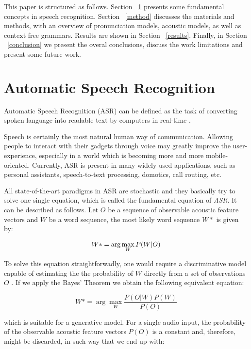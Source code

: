 \documentclass[twocolumn]{bmcart}%
\begin{document}
This paper is structured as follows. Section ~\ref{sec:speech-recognition} presents some fundamental concepts in speech recognition. Section ~\ref{method} discusses the materials and methods, with an overview of pronunciation models, acoustic models, as well as context free grammars. Results are shown in Section ~\ref{results}. Finally, in Section ~\ref{conclusion} we present the overal conclusions, discuss the work limitations and present some future work.

\section{Automatic Speech Recognition}\label{sec:speech-recognition}

Automatic Speech Recognition (ASR) can be defined as the task of converting spoken language into readable text by computers in real-time \cite{Huang2001}. 

Speech is certainly the most natural human way of communication. Allowing people to interact with their gadgets through voice may greatly improve the user-experience, especially in a world which is becoming more and more mobile-oriented. Currently, ASR is present in many widely-used applications, such as personal assistants, speech-to-text processing, domotics, call routing, etc. \cite{Candeias2014}

All state-of-the-art paradigms in ASR are stochastic and they basically try to solve one single equation, which is called the fundamental equation of \emph{ASR}. It can be described as follows. Let $O$ be a sequence of observable acoustic feature vectors and $W$ be a word sequence, the most likely word sequence $W*$ is given by:

\begin{equation}{\label{eq:fund-asr}}
W*= \arg\max_{W}P(W|O)
\end{equation}

To solve this equation straightforwadly, one would require a discriminative model
capable of estimating the the probability of $W$ directly from a set of observations $O$ \cite{Gales2008}.
If we apply the Bayes' Theorem we obtain the following equivalent equation:

\begin{equation}
W*= \arg\max_{W}\frac{P(O|W)P(W)}{P(O)}
\end{equation}

which is suitable for a generative model. For a single audio input, the probability of the observable acoustic feature vectors $P(O)$ is a constant and, therefore, might be discarded, in such way that we end up with:
\end{document}

